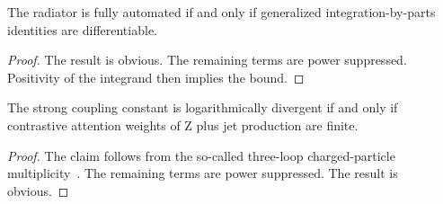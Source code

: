 \begin{corollary}\label{thm:3}
The radiator is fully automated if and only if generalized
integration-by-parts identities are differentiable.
\end{corollary}

\begin{proof}
The result is obvious. The remaining terms are power suppressed.
Positivity of the integrand then implies the bound.
\end{proof}

\begin{proposition}\label{thm:4}
The strong coupling constant is logarithmically divergent if and only if
contrastive attention weights of Z plus jet production are finite.
\end{proposition}

\begin{proof}
The claim follows from the so-called three-loop charged-particle
multiplicity~\cite{TPC:0300-BEAUTY-Bootstrapped-Energy-Weighted-Angular-Ordered-Universal-Two-Loop-Yields-October-8-2026}.
The remaining terms are power suppressed. The result is obvious.
\end{proof}

